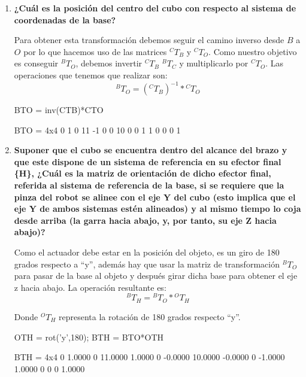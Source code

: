 \documentclass[11pt,a4paper]{article}
\begin{document}
\begin{enumerate}
    \item \textbf{¿Cuál es la posición del centro del cubo con respecto al sistema de coordenadas de la base?}
    
    Para obtener esta transformación debemos seguir el camino inverso desde ${B}$ a ${O}$ por lo que hacemos uso de las matrices $^CT_B$ y $^CT_O$. Como nuestro objetivo es conseguir $^BT_O$, debemos invertir $^CT_B$ \rightarrow $^BT_C$ y multiplicarlo por $^CT_O$. Las operaciones que tenemos que realizar son:
    \[^BT_O = \left({}^CT_B\right)^{-1} * {}^CT_O\]
    
\begin{matlabcode}
BTO = inv(CTB)*CTO
\end{matlabcode}
\begin{matlaboutput}
BTO = 4x4    
     0     1     0    11
    -1     0     0    10
     0     0     1     1
     0     0     0     1
\end{matlaboutput}
    
    \item \textbf{Suponer que el cubo se encuentra dentro del alcance del brazo y que este dispone de un sistema de  referencia en su efector final \{H\}, ¿Cuál es la matriz de orientación de dicho efector final, referida al  sistema de referencia de la base, si se requiere que la pinza del robot se alinee con el eje Y del cubo (esto implica que el eje Y de ambos sistemas estén alineados) y al mismo tiempo lo coja desde arriba (la garra hacia abajo, y, por tanto, su eje Z hacia abajo)?}
    
    Como el actuador debe estar en la posición del objeto, es un giro de 180 grados respecto a ``y'', además hay que usar la matriz de transformación $^BT_O$ para pasar de la base al objeto y después girar dicha base para obtener el eje z hacia abajo. La operación resultante es:
    \[{}^BT_H = {}^BT_O * {}^OT_H \]
    
    Donde ${}^OT_H$ representa la rotación de 180 grados respecto ``y''.
    
\begin{matlabcode}
OTH = rot('y',180);
BTH = BTO*OTH
\end{matlabcode}
\begin{matlaboutput}
BTH = 4x4    
         0    1.0000         0   11.0000
    1.0000         0   -0.0000   10.0000
   -0.0000         0   -1.0000    1.0000
         0         0         0    1.0000
\end{matlaboutput}
    

\end{enumerate}
\end{document}
